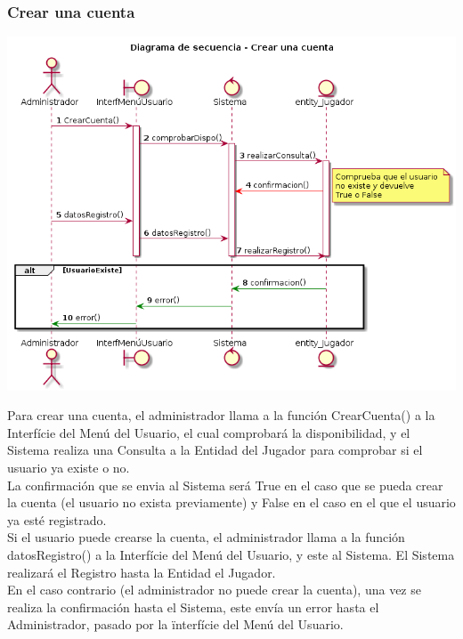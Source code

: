 \subsubsection{Crear una cuenta}
\begin{center}
  \includegraphics[width=1\textwidth]{./imatges/administrador/Crear_una_cuenta.png}
  \end{center}
  Para crear una cuenta, el administrador llama a la función CrearCuenta() a la Interfície del Menú del Usuario, el cual comprobará la disponibilidad, y el Sistema realiza una Consulta a la Entidad del Jugador para comprobar si el usuario ya existe o no. \\
  La confirmación que se envia al Sistema será True en el caso que se pueda crear la cuenta (el usuario no exista previamente) y False en el caso en el que el usuario ya esté registrado.
  \\Si el usuario puede crearse la cuenta, el administrador llama a la función datosRegistro() a la Interfície del Menú del Usuario, y este al Sistema. El Sistema realizará el Registro hasta la Entidad el Jugador.
  \\En el caso contrario (el administrador no puede crear la cuenta), una vez se realiza la confirmación hasta el Sistema, este envía un error hasta el Administrador, pasado por la ïnterfície del Menú del Usuario.
  
